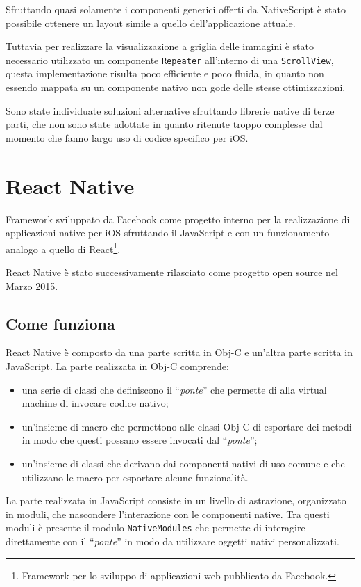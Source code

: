 Sfruttando quasi solamente i componenti generici offerti da NativeScript è stato possibile ottenere un layout simile a quello dell'applicazione attuale.

Tuttavia per realizzare la visualizzazione a griglia delle immagini è stato necessario utilizzato un componente \texttt{Repeater} all'interno di una \texttt{ScrollView}, questa implementazione risulta poco efficiente e poco fluida, in quanto non essendo mappata su un componente nativo non gode delle stesse ottimizzazioni.

Sono state individuate soluzioni alternative sfruttando librerie native di terze parti, che non sono state adottate in quanto ritenute troppo complesse dal momento che fanno largo uso di codice specifico per iOS.

\FloatBarrier
\section{React Native}

Framework sviluppato da Facebook come progetto interno per la realizzazione di applicazioni native per iOS sfruttando il JavaScript e con un funzionamento analogo a quello di React\footnote{Framework per lo sviluppo di applicazioni web pubblicato da Facebook.}.

React Native è stato successivamente rilasciato come progetto open source nel Marzo 2015.

\subsection{Come funziona}

React Native è composto da una parte scritta in Obj-C e un'altra parte scritta in JavaScript.
La parte realizzata in Obj-C comprende:
\begin{itemize}
\item una serie di classi che definiscono il ``\textit{ponte}'' che permette di alla virtual machine di invocare codice nativo;
\item un'insieme di macro che permettono alle classi Obj-C di esportare dei metodi in modo che questi possano essere invocati dal ``\textit{ponte}'';
\item un'insieme di classi che derivano dai componenti nativi di uso comune e che utilizzano le macro per esportare alcune funzionalità.
\end{itemize}
La parte realizzata in JavaScript consiste in un livello di astrazione, organizzato in moduli, che nascondere l'interazione con le componenti native.
Tra questi moduli è presente il modulo \texttt{NativeModules} che permette di interagire direttamente con il ``\textit{ponte}'' in modo da utilizzare oggetti nativi personalizzati.

